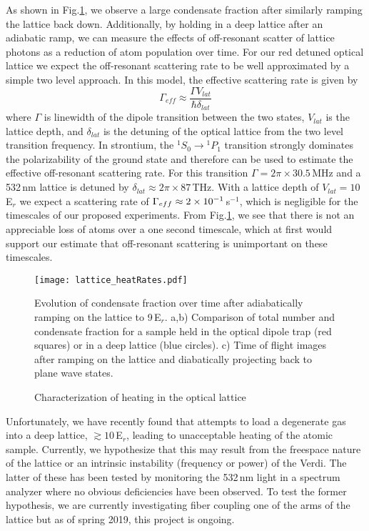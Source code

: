 As shown in Fig.\;\ref{fig:heatingRates}, we observe a large condensate fraction after similarly ramping the lattice back down. 
Additionally, by holding in a deep lattice after an adiabatic ramp, we can measure the effects of off-resonant scatter of lattice photons as a reduction of atom population over time.
For our red detuned optical lattice we expect the off-resonant scattering rate to be well approximated by a simple two level approach. In this model, the effective scattering rate is given by \cite{Jaksch2005}
	\begin{equation} \label{eq:offResScatter}
		\Gamma_{eff} \approx \frac{\Gamma V_{lat}}{\hbar \delta_{lat}}
	\end{equation}
where $\Gamma$ is linewidth of the dipole transition between the two states, $V_{lat}$ is the lattice depth, and $\delta_{lat}$ is the detuning of the optical lattice from the two level transition frequency.
In strontium, the $^1S_0\!\rightarrow\!^1P_1$ transition strongly dominates the polarizability of the ground state and therefore can be used to estimate the effective off-resonant scattering rate.
For this transition $\Gamma = 2 \pi \times 30.5\,$MHz and a 532\,nm lattice is detuned by $\delta_{lat} \approx 2 \pi \times 87\,$THz.
With a lattice depth of $V_{lat}=10\,$E$_r$ we expect a scattering rate of $\Gamma_{eff} \approx 2\times 10^{-1}\,$s$^{-1}$, which is negligible for the timescales of our proposed experiments.
From Fig.\;\ref{fig:heatingRates}, we see that there is not an appreciable loss of atoms over a one second timescale, which at first would support our estimate that off-resonant scattering is unimportant on these timescales.
	\begin{figure}
	\centerline{
		\texttt{[image: lattice\_heatRates.pdf]}}
		\caption{Characterization of heating in the optical lattice}{Evolution of condensate fraction over time after adiabatically ramping on the lattice to 9\,E$_r$. a,b) Comparison of total number and condensate fraction for a sample held in the optical dipole trap (red squares) or in a deep lattice (blue circles). c) Time of flight images after ramping on the lattice and diabatically projecting back to plane wave states.}
		 \label{fig:heatingRates}
	\end{figure}
Unfortunately, we have recently found that attempts to load a degenerate gas into a deep lattice, $\gtrsim 10$\,E$_r$, leading to unacceptable heating of the atomic sample.
Currently, we hypothesize that this may result from the freespace nature of the lattice or an intrinsic instability (frequency or power) of the Verdi.
The latter of these has been tested by monitoring the 532\,nm light in a spectrum analyzer where no obvious deficiencies have been observed.
To test the former hypothesis, we are currently investigating fiber coupling one of the arms of the lattice but as of spring 2019, this project is ongoing.

